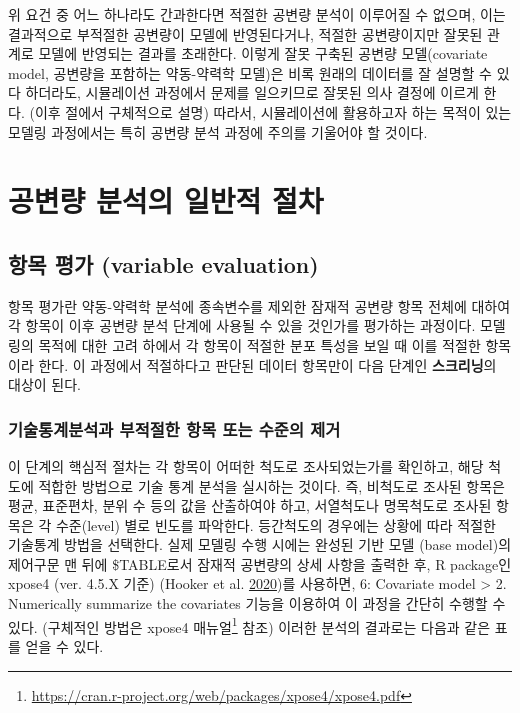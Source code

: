 \documentclass[
  11pt,
  krantz2, a4paper, twoside]{krantz}
\theoremstyle{definition}
\theoremstyle{definition}
\theoremstyle{definition}
\theoremstyle{remark}
\begin{document}
위 요건 중 어느 하나라도 간과한다면 적절한 공변량 분석이 이루어질 수 없으며, 이는 결과적으로 부적절한 공변량이 모델에 반영된다거나, 적절한 공변량이지만 잘못된 관계로 모델에 반영되는 결과를 초래한다. 이렇게 잘못 구축된 공변량 모델(covariate model, 공변량을 포함하는 약동-약력학 모델)은 비록 원래의 데이터를 잘 설명할 수 있다 하더라도, 시뮬레이션 과정에서 문제를 일으키므로 잘못된 의사 결정에 이르게 한다. (이후 절에서 구체적으로 설명) 따라서, 시뮬레이션에 활용하고자 하는 목적이 있는 모델링 과정에서는 특히 공변량 분석 과정에 주의를 기울어야 할 것이다.

\hypertarget{uxacf5uxbcc0uxb7c9-uxbd84uxc11duxc758-uxc77cuxbc18uxc801-uxc808uxcc28}{%
\section{공변량 분석의 일반적 절차}\label{uxacf5uxbcc0uxb7c9-uxbd84uxc11duxc758-uxc77cuxbc18uxc801-uxc808uxcc28}}

\hypertarget{variable-eval}{%
\subsection{항목 평가 (variable evaluation)}\label{variable-eval}}

항목 평가란 약동-약력학 분석에 종속변수를 제외한 잠재적 공변량 항목 전체에 대하여 각 항목이 이후 공변량 분석 단계에 사용될 수 있을 것인가를 평가하는 과정이다. 모델링의 목적에 대한 고려 하에서 각 항목이 적절한 분포 특성을 보일 때 이를 적절한 항목이라 한다. 이 과정에서 적절하다고 판단된 데이터 항목만이 다음 단계인 \textbf{스크리닝}의 대상이 된다.

\hypertarget{uxae30uxc220uxd1b5uxacc4uxbd84uxc11duxacfc-uxbd80uxc801uxc808uxd55c-uxd56duxbaa9-uxb610uxb294-uxc218uxc900uxc758-uxc81cuxac70}{%
\subsubsection{기술통계분석과 부적절한 항목 또는 수준의 제거}\label{uxae30uxc220uxd1b5uxacc4uxbd84uxc11duxacfc-uxbd80uxc801uxc808uxd55c-uxd56duxbaa9-uxb610uxb294-uxc218uxc900uxc758-uxc81cuxac70}}

이 단계의 핵심적 절차는 각 항목이 어떠한 척도로 조사되었는가를 확인하고, 해당 척도에 적합한 방법으로 기술 통계 분석을 실시하는 것이다. 즉, 비척도로 조사된 항목은 평균, 표준편차, 분위 수 등의 값을 산출하여야 하고, 서열척도나 명목척도로 조사된 항목은 각 수준(level) 별로 빈도를 파악한다. 등간척도의 경우에는 상황에 따라 적절한 기술통계 방법을 선택한다. 실제 모델링 수행 시에는 완성된 기반 모델 (base model)의 제어구문 맨 뒤에 \$TABLE로서 잠재적 공변량의 상세 사항을 출력한 후, R package인 xpose4 (ver. 4.5.X 기준) (Hooker et al. \protect\hyperlink{ref-R-xpose4}{2020})를 사용하면, 6: Covariate model \textgreater{} 2. Numerically summarize the covariates 기능을 이용하여 이 과정을 간단히 수행할 수 있다. (구체적인 방법은 xpose4 매뉴얼\footnote{\url{https://cran.r-project.org/web/packages/xpose4/xpose4.pdf}} 참조) 이러한 분석의 결과로는 다음과 같은 표를 얻을 수 있다.
\end{document}
